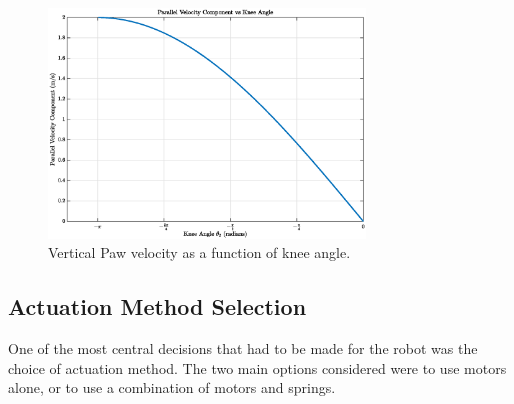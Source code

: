 \begin{figure}[h]
    \centering
    \includegraphics[width=0.75\textwidth]{Images/vertical_jacobian_velocity.eps}
    \caption{Vertical Paw velocity as a function of knee angle.}
    \label{fig:vertical_jacobian_velocity}
\end{figure}

\subsection{Actuation Method Selection}

One of the most central decisions that had to be made for the robot was the choice of actuation method. The two main options considered were to use motors alone, or to use a combination of motors and springs. 

